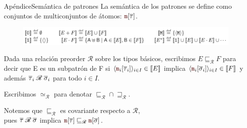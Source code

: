 \documentclass{beamer}
\newcommand{\msgtag}[1]{\texttt{\textcolor{msg-color}{#1}}}
\newcommand{\msgstore}[2]{\msgtag{#1}[\overline{#2}]}
\begin{document}
\begin{frame}{Apéndice}{Semántica de patrones}
    La semántica de los patrones se define como conjuntos de multiconjuntos de átomos: $\msgstore{m}{\tau}$.

    \begin{figure}[H]
        \includegraphics[width=\textwidth]{subpattern}
    \end{figure}

    Dada una relación preorder $\mathscr{R}$ sobre los tipos básicos, escribimos $E \sqsubseteq_\mathscr{R} F$ para decir que E es un subpatrón de F si $\langle \msgtag{m}_i[\overline{\tau}_i] \rangle_{i \in I} \in \llbracket E \rrbracket$ implica $\langle \msgtag{m}_i[\overline{\sigma}_i] \rangle_{i \in I} \in \llbracket F \rrbracket$ y además $\overline{\tau}_i \hspace{0.25em} \mathscr{R} \hspace{0.25em} \overline{\sigma}_i$ para todo $i \in I$.
    \vspace{1em}

    Escribimos $\simeq_\mathscr{R}$ para denotar $\sqsubseteq_\mathscr{R} \cap \sqsupseteq_\mathscr{R}$.
    \vspace{1em}

    Notemos que $\sqsubseteq_\mathscr{R}$ es covariante respecto a $\mathscr{R}$,
    \\ pues $\overline{\tau} \hspace{0.25em} \mathscr{R} \hspace{0.25em} \overline{\sigma}$ implica $\msgstore{m}{\tau} \sqsubseteq_\mathscr{R} \msgstore{m}{\sigma}$.
\end{frame}
\end{document}
